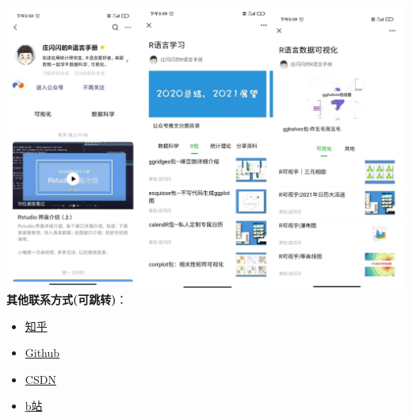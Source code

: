 \documentclass[
]{book}
\begin{document}
\includegraphics{figure/me.png}
\textbf{其他联系方式(可跳转)}：

\begin{itemize}
\item
  \href{https://www.zhihu.com/people/zhuangshanshan}{知乎}
\item
  \href{https://github.com/liangliangzhuang}{Github}
\item
  \href{https://i.csdn.net/\#/uc/profile}{CSDN}
\item
  \href{https://space.bilibili.com/226576305?share_medium=android\&share_source=weixin\&bbid=XYEE12AEF838D8A42E42282DBF81876CFC7CC\&ts=1611217375878}{b站}
\end{itemize}

\printbibliography
\end{document}
